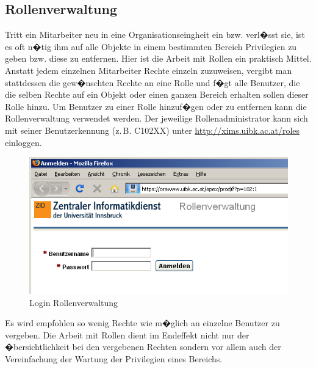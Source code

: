 %
%
%

\subsection{Rollenverwaltung}
\label{rollenverwaltung}
Tritt ein Mitarbeiter neu in eine Organisationseingheit ein bzw. verl�sst sie, ist es oft n�tig ihm auf alle Objekte in einem bestimmten Bereich Privilegien zu geben bzw. diese zu entfernen. Hier ist die Arbeit mit Rollen ein praktisch Mittel. Anstatt jedem einzelnen Mitarbeiter Rechte einzeln zuzuweisen, vergibt man stattdessen die gew�nschten Rechte an eine Rolle und f�gt alle Benutzer, die die selben Rechte auf ein Objekt oder einen ganzen Bereich erhalten sollen dieser Rolle hinzu. Um Benutzer zu einer Rolle hinzuf�gen oder zu entfernen kann die Rollenverwaltung verwendet werden. Der jeweilige Rollenadministrator kann sich mit seiner
Benutzerkennung (z.\,B. C102XX) unter \url{http://xims.uibk.ac.at/roles} einloggen.

\begin{figure}[!ht]
	\centering
		\includegraphics[width=\textwidth]{./images/rollenverwaltung.png}
	\caption{Login Rollenverwaltung}
	\label{fig:rollenverwaltung}
\end{figure}

\begin{Hinweis}
Es wird empfohlen so wenig Rechte wie m�glich an einzelne Benutzer zu vergeben. Die Arbeit mit Rollen dient im Endeffekt nicht nur der �bersichtlichkeit bei den vergebenen Rechten sondern vor allem auch der Vereinfachung der Wartung der Privilegien eines Bereichs.
\end{Hinweis}
